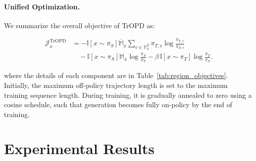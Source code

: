 \documentclass{llmxive}
\begin{document}
\paragraph{Unified Optimization.}
We summarize the overall objective of TrOPD as:

\begin{equation}
\begin{aligned}
\mathcal{J}_{x}^{\mathrm{TrOPD}}
&=
-{
  \mathbb{I}[x \sim \pi_S]\overline{\mathbb{M}}_{x}}
 {
  \sum_{v \in \mathcal{V}^{T}_{k}}
  \pi_{T,v}
  \log \frac{\pi_{T,v}}{\pi_{S,v}}
 } \\
&\quad
-
{
  \mathbb{I}[x \sim \pi_S]\mathbb{M}_{x}}
\log \frac{\pi_S}{\pi_T}
-
\beta \,
\mathbb{I}[x \sim \pi_T]
\log \frac{\pi_T}{\pi_S} .
\end{aligned}
\end{equation}


where the details of each component are in Table~\ref{tab:region_objectives}. Initially, the maximum off-policy trajectory length is set to the maximum training sequence length. During training, it is gradually annealed to zero using a cosine schedule, such that generation becomes fully on-policy by the end of training.

















\section{Experimental Results}
\end{document}

